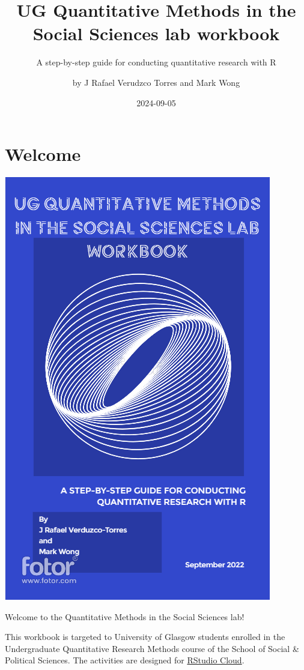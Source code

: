 \documentclass[
]{book}
\title{UG Quantitative Methods in the Social Sciences lab workbook}
\subtitle{A step-by-step guide for conducting quantitative research with R}
\author{by J Rafael Verudzco Torres and Mark Wong}
\date{2024-09-05}
\begin{document}
\maketitle

{
\setcounter{tocdepth}{1}
\tableofcontents
}
\hypertarget{Welcome}{%
\chapter*{Welcome}\label{Welcome}}

\includegraphics{./images/cover.PNG}

Welcome to the Quantitative Methods in the Social Sciences lab!

This workbook is targeted to University of Glasgow students enrolled in the Undergraduate Quantitative Research Methods course of the School of Social \& Political Sciences. The activities are designed for \href{https://rstudio.cloud/}{RStudio Cloud}.
\end{document}

